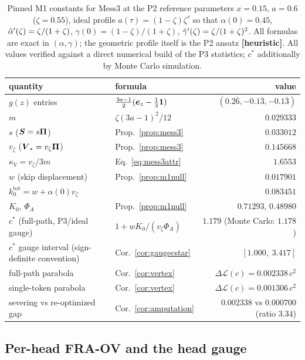 \documentclass{article}
\begin{document}
\begin{table}[h]
\centering
\begin{tabular}{llr}
\hline
quantity & formula & value \\
\hline
$g(z)$ entries & $\tfrac{3a-1}{2}(\boldsymbol{e}_z - \tfrac13\boldsymbol{1})$ & $(0.2\overline{6}, -0.1\overline{3}, -0.1\overline{3})$ \\
$m$ & $\zeta(3a-1)^2/12$ & $0.029333$ \\
$s$ ($\boldsymbol{S} = s\boldsymbol{\Pi}$) & Prop.~\ref{prop:mess3} & $0.033012$ \\
$v_\zeta$ ($\boldsymbol{V}_* = v_\zeta\boldsymbol{\Pi}$) & Prop.~\ref{prop:mess3} & $0.145668$ \\
$\kappa_V = v_\zeta/3m$ & Eq.~\eqref{eq:mess3attr} & $1.6553$ \\
$w$ (skip displacement) & Prop.~\ref{prop:m1null} & $0.017901$ \\
$k_0^{\mathrm{tot}} = w + \alpha(0)v_\zeta$ & & $0.083451$ \\
$K_0$, $\Phi_A$ & Prop.~\ref{prop:m1null} & $0.71293$, $0.48980$ \\
$c^*$ (full-path, P3/ideal gauge) & $1 + wK_0/(v_\zeta\Phi_A)$ & $1.179$ (Monte Carlo: $1.178$) \\
$c^*$ gauge interval (sign-definite convention) & Cor.~\ref{cor:gaugecstar} & $[1.000,\; 3.417]$ \\
full-path parabola & Cor.~\ref{cor:vertex} & $\Delta\mathcal{L}(c) = 0.002338\, c^2$ \\
single-token parabola & Cor.~\ref{cor:vertex} & $\Delta\mathcal{L}(c) = 0.001306\, c^2$ \\
severing vs re-optimized gap & Cor.~\ref{cor:amputation} & $0.002338$ vs $0.000700$ (ratio $3.34$) \\
\hline
\end{tabular}
\caption{Pinned M1 constants for Mess3 at the P2 reference parameters $x = 0.15$, $a = 0.6$ ($\zeta = 0.55$), ideal profile $a(\tau) = (1-\zeta)\zeta^\tau$ so that $\alpha(0) = 0.45$, $\Tilde{\alpha}'(\zeta) = \zeta/(1+\zeta)$, $\gamma(0) = (1-\zeta)/(1+\zeta)$, $\Tilde{\gamma}'(\zeta) = \zeta/(1+\zeta)^2$. All formulas are exact in $(\alpha, \gamma)$; the geometric profile itself is the P2 ansatz \textbf{[heuristic]}. All values verified against a direct numerical build of the P3 statistics; $c^*$ additionally by Monte Carlo simulation.}
\label{tab:mess3}
\end{table}

\subsection{Per-head FRA-OV and the head gauge}
\end{document}
